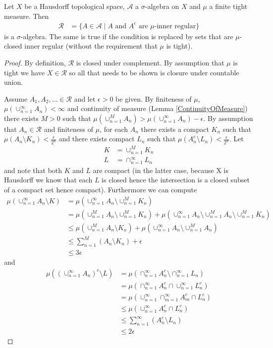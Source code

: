 \begin{lem}\label{InnerRegularSetsSigmaAlgebra}Let $X$ be a Hausdorff topological space, $\mathcal{A}$
  a $\sigma$-algebra on $X$ and $\mu$ a finite tight measure.  Then
\begin{align*}
\mathcal{R} &= \lbrace A \in \mathcal{A} \mid A \text { and } A^c
\text{ are $\mu$-inner regular} \rbrace
\end{align*}
is a $\sigma$-algebra.  The same is true if the condition is replaced
by sets that are $\mu$-closed inner regular (without the requirement
that $\mu$ is tight).
\end{lem}
\begin{proof}
By definition, $\mathcal{R}$ is closed under complement.  By
assumption that $\mu$ is tight we have $X \in \mathcal{R}$ so all that
needs to be shown is closure under countable union.

Assume $A_1, A_2, \dots \in \mathcal{R}$ and let $\epsilon>0$ be
given.  By finiteness of $\mu$, $\mu(\cup_{n=1}^\infty A_n) < \infty$ and
continuity of measure (Lemma \ref{ContinuityOfMeasure}) there exists $M>0$ such that $\mu(\cup_{n=1}^M
A_n) > \mu(\cup_{n=1}^\infty A_n) - \epsilon$.
 By assumption that $A_n \in \mathcal{R}$ and finiteness of $\mu$, for each
$A_n$ there exists a compact $K_n$ such that $\mu(A_n \setminus K_n) <
\frac{\epsilon}{2^n}$ and there exists compact $L_n$ such that $\mu(A_n^c \setminus L_n) <
\frac{\epsilon}{2^n}$. Let
\begin{align*}
K &= \cup_{n=1}^M K_n \\
L &= \cap_{n=1}^\infty L_n
\end{align*}
and note that both $K$ and $L$ are compact (in the latter case,
because X is Hausdorff we know that each $L$ is closed hence the
intersection is a closed subset of a compact set hence compact).
Furthermore we can compute
\begin{align*}
\mu(\cup_{n=1}^\infty A_n \setminus K) &= \mu(\cup_{n=1}^\infty A_n
\setminus \cup_{n=1}^M K_n)  \\
&= \mu(\cup_{n=1}^M A_n
\setminus \cup_{n=1}^M K_n)  + \mu(\cup_{n=1}^\infty A_n \setminus \cup_{n=1}^M A_n
\setminus \cup_{n=1}^M K_n)\\
&\leq \mu(\cup_{n=1}^M A_n \setminus K_n)  + \mu(\cup_{n=1}^\infty A_n
\setminus \cup_{n=1}^M A_n)\\
&\leq \sum_{n=1}^M(A_n \setminus K_n)  + \epsilon \\
&\leq 3 \epsilon
\end{align*}
and
\begin{align*}
\mu((\cup_{n=1}^\infty A_n)^c \setminus L) &=\mu(\cap_{n=1}^\infty
A_n^c \setminus \cap_{n=1}^\infty L_n) \\
 &=\mu(\cap_{n=1}^\infty
A_n^c \cap \cup_{n=1}^\infty L_n^c) \\
 &=\mu(\cup_{n=1}^\infty \cap_{m=1}^\infty
A_m^c \cap L_n^c) \\
 &\leq \mu(\cup_{n=1}^\infty 
A_n^c \cap L_n^c) \\
 &\leq \sum_{n=1}^\infty (
A_n^c \setminus L_n) \\
&\leq 2 \epsilon
\end{align*}


\end{proof}

